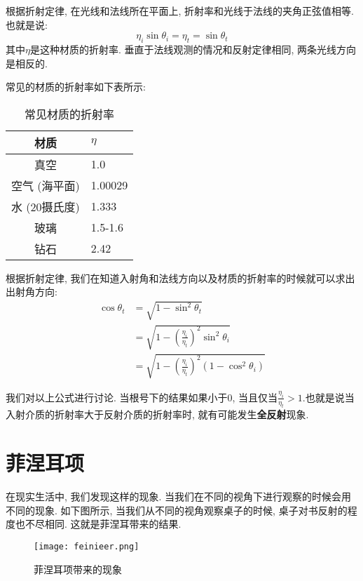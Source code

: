 根据折射定律, 在光线和法线所在平面上, 折射率和光线于法线的夹角正弦值相等. 也就是说: 
\begin{equation}
	\eta_i\sin\theta_i = \eta_t=\sin\theta_t
\end{equation}
其中$\eta$是这种材质的折射率. 垂直于法线观测的情况和反射定律相同, 两条光线方向是相反的. 

常见的材质的折射率如下表所示: 

\begin{table}[H]
	\centering
	\begin{tabular}{cl}
		\hline
		材质       & $\eta$  \\ \hline
		真空       & 1.0     \\
		空气 (海平面)   & 1.00029 \\
		水 (20摄氏度)  & 1.333   \\
		玻璃       & 1.5-1.6 \\
		钻石       & 2.42  \\ \hline
	\end{tabular}
	\caption{常见材质的折射率}
\end{table}

根据折射定律, 我们在知道入射角和法线方向以及材质的折射率的时候就可以求出出射角方向: 
\begin{equation}
	\begin{split}
		\cos\theta_t&=\sqrt{1-\sin^2\theta_t}\\
		&=\sqrt{1-(\frac{\eta_i}{\eta_t})^2\sin^2\theta_i}\\
		&=\sqrt{1-(\frac{\eta_i}{\eta_t})^2(1-\cos^2\theta_i)}
	\end{split}
\end{equation}

我们对以上公式进行讨论. 当根号下的结果如果小于$0$, 当且仅当$\frac{\eta_i}{\eta_t}>1$.也就是说当入射介质的折射率大于反射介质的折射率时, 就有可能发生\textbf{全反射}现象. 

\section{菲涅耳项}

在现实生活中, 我们发现这样的现象. 当我们在不同的视角下进行观察的时候会用不同的现象. 如下图所示, 当我们从不同的视角观察桌子的时候, 桌子对书反射的程度也不尽相同. 这就是菲涅耳带来的结果. 

\begin{figure}[H]
	\centering
	\texttt{[image: feinieer.png]}
	\caption{菲涅耳项带来的现象}
	\label{fig:fne}
\end{figure}

